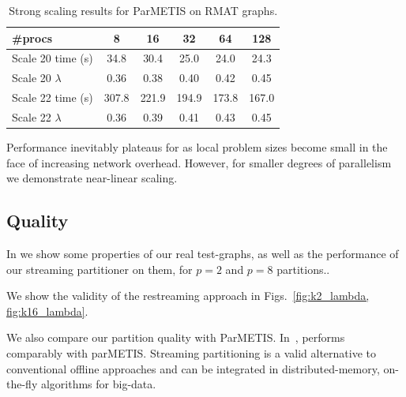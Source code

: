 \begin{table}
\caption{Strong scaling results for ParMETIS on RMAT graphs.}
\centering
\small
{ \begin{tabular}{ l | c | c | c | c | c }    \toprule
\#procs & 8 & 16 & 32 & 64 & 128 \\ \midrule
Scale 20 time (s) & 34.8 & 30.4 & 25.0 & 24.0 & 24.3 \\%
Scale 20 $\lambda$ & 0.36 & 0.38 & 0.40 & 0.42 & 0.45 \\%
Scale 22 time (s) & 307.8 & 221.9 & 194.9 & 173.8 & 167.0 \\
Scale 22 $\lambda$ & 0.36 & 0.39 & 0.41 & 0.43 & 0.45 \\
\hline
\end{tabular}\par
}
\label{tab:rmatpmstrong}
\end{table}

Performance inevitably plateaus for \ourmethod as local problem sizes become small in the face of increasing network overhead. However, for smaller degrees of parallelism we demonstrate near-linear scaling. 

\subsection{Quality} \label{sec:qual}
In  we show some properties of our real test-graphs, as well as the performance of our streaming partitioner on them, for $p=2$ and $p=8$ partitions.. 

We show the validity of the restreaming approach in Figs.~\ref{fig:k2_lambda, fig:k16_lambda}.

We also compare our partition quality with ParMETIS.
In~, \ourmethod performs comparably with parMETIS. Streaming partitioning is a valid alternative to conventional offline approaches and can be integrated in distributed-memory, on-the-fly algorithms for big-data.

